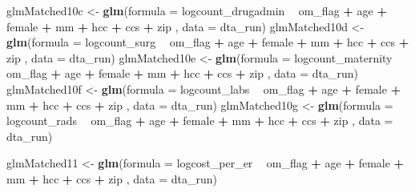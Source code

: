 \documentclass[]{article}
\newenvironment{Shaded}{\begin{snugshade}}{\end{snugshade}}
\newcommand{\KeywordTok}[1]{\textcolor[rgb]{0.13,0.29,0.53}{\textbf{#1}}}
\newcommand{\DataTypeTok}[1]{\textcolor[rgb]{0.13,0.29,0.53}{#1}}
\newcommand{\StringTok}[1]{\textcolor[rgb]{0.31,0.60,0.02}{#1}}
\newcommand{\OperatorTok}[1]{\textcolor[rgb]{0.81,0.36,0.00}{\textbf{#1}}}
\newcommand{\NormalTok}[1]{#1}
\begin{document}
\begin{Shaded}
\begin{Highlighting}[]
\NormalTok{glmMatched10c <-}\StringTok{ }\KeywordTok{glm}\NormalTok{(}\DataTypeTok{formula =}\NormalTok{ logcount_drugadmin }\OperatorTok{~}\StringTok{ }\NormalTok{om_flag }\OperatorTok{+}\StringTok{ }\NormalTok{age }\OperatorTok{+}\StringTok{ }\NormalTok{female }\OperatorTok{+}\StringTok{ }\NormalTok{mm }\OperatorTok{+}\StringTok{ }\NormalTok{hcc }\OperatorTok{+}\StringTok{ }\NormalTok{ccs }\OperatorTok{+}\StringTok{ }\NormalTok{zip ,}
                    \DataTypeTok{data    =}\NormalTok{ dta_run)}
\NormalTok{glmMatched10d <-}\StringTok{ }\KeywordTok{glm}\NormalTok{(}\DataTypeTok{formula =}\NormalTok{ logcount_surg }\OperatorTok{~}\StringTok{ }\NormalTok{om_flag }\OperatorTok{+}\StringTok{ }\NormalTok{age }\OperatorTok{+}\StringTok{ }\NormalTok{female }\OperatorTok{+}\StringTok{ }\NormalTok{mm }\OperatorTok{+}\StringTok{ }\NormalTok{hcc }\OperatorTok{+}\StringTok{ }\NormalTok{ccs }\OperatorTok{+}\StringTok{ }\NormalTok{zip ,}
                    \DataTypeTok{data    =}\NormalTok{ dta_run)}
\NormalTok{glmMatched10e <-}\StringTok{ }\KeywordTok{glm}\NormalTok{(}\DataTypeTok{formula =}\NormalTok{ logcount_maternity }\OperatorTok{~}\StringTok{ }\NormalTok{om_flag }\OperatorTok{+}\StringTok{ }\NormalTok{age }\OperatorTok{+}\StringTok{ }\NormalTok{female }\OperatorTok{+}\StringTok{ }\NormalTok{mm }\OperatorTok{+}\StringTok{ }\NormalTok{hcc }\OperatorTok{+}\StringTok{ }\NormalTok{ccs }\OperatorTok{+}\StringTok{ }\NormalTok{zip ,}
                    \DataTypeTok{data    =}\NormalTok{ dta_run)}
\NormalTok{glmMatched10f <-}\StringTok{ }\KeywordTok{glm}\NormalTok{(}\DataTypeTok{formula =}\NormalTok{ logcount_labs }\OperatorTok{~}\StringTok{ }\NormalTok{om_flag }\OperatorTok{+}\StringTok{ }\NormalTok{age }\OperatorTok{+}\StringTok{ }\NormalTok{female }\OperatorTok{+}\StringTok{ }\NormalTok{mm }\OperatorTok{+}\StringTok{ }\NormalTok{hcc }\OperatorTok{+}\StringTok{ }\NormalTok{ccs }\OperatorTok{+}\StringTok{ }\NormalTok{zip ,}
                    \DataTypeTok{data    =}\NormalTok{ dta_run)}
\NormalTok{glmMatched10g <-}\StringTok{ }\KeywordTok{glm}\NormalTok{(}\DataTypeTok{formula =}\NormalTok{ logcount_rads }\OperatorTok{~}\StringTok{ }\NormalTok{om_flag }\OperatorTok{+}\StringTok{ }\NormalTok{age }\OperatorTok{+}\StringTok{ }\NormalTok{female }\OperatorTok{+}\StringTok{ }\NormalTok{mm }\OperatorTok{+}\StringTok{ }\NormalTok{hcc }\OperatorTok{+}\StringTok{ }\NormalTok{ccs }\OperatorTok{+}\StringTok{ }\NormalTok{zip ,}
                    \DataTypeTok{data    =}\NormalTok{ dta_run)}


\NormalTok{glmMatched11 <-}\StringTok{ }\KeywordTok{glm}\NormalTok{(}\DataTypeTok{formula =}\NormalTok{ logcost_per_er }\OperatorTok{~}\StringTok{ }\NormalTok{om_flag }\OperatorTok{+}\StringTok{ }\NormalTok{age }\OperatorTok{+}\StringTok{ }\NormalTok{female }\OperatorTok{+}\StringTok{ }\NormalTok{mm }\OperatorTok{+}\StringTok{ }\NormalTok{hcc }\OperatorTok{+}\StringTok{ }\NormalTok{ccs }\OperatorTok{+}\StringTok{ }\NormalTok{zip ,}
                   \DataTypeTok{data    =}\NormalTok{ dta_run)}


\end{Highlighting}
\end{Shaded}
\end{document}
